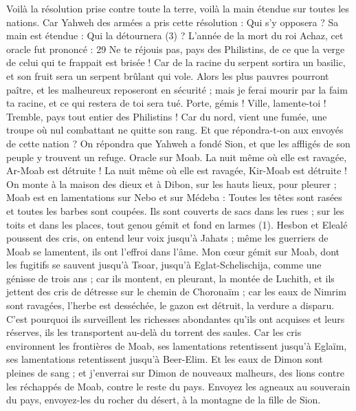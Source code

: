 \begin{multicols}{2}
{Voilà la résolution prise contre toute la terre, voilà la main étendue sur toutes les nations.
Car Yahweh des armées a pris cette résolution : Qui s’y opposera ? Sa main est étendue : Qui la détournera (3) ?
L'année de la mort du roi Achaz, cet oracle fut prononcé : 29 Ne te réjouis pas, pays des Philistins, de ce que la verge de celui qui te frappait est brisée ! Car de la racine du serpent sortira un basilic, et son fruit sera un serpent brûlant qui vole.
Alors les plus pauvres pourront paître, et les malheureux reposeront en sécurité ; mais je ferai mourir par la faim ta racine, et ce qui restera de toi sera tué.
Porte, gémis ! Ville, lamente-toi ! Tremble, pays tout entier des Philistins ! Car du nord, vient une fumée, une troupe où nul combattant ne quitte son rang.
Et que répondra-t-on aux envoyés de cette nation ? On répondra que Yahweh a fondé Sion, et que les affligés de son peuple y trouvent un refuge.
\VerseOne{}Oracle sur Moab. La nuit même où elle est ravagée, Ar-Moab est détruite ! La nuit même où elle est ravagée, Kir-Moab est détruite !
On monte à la maison des dieux et à Dibon, sur les hauts lieux, pour pleurer ; Moab est en lamentations sur Nebo et sur Médeba : Toutes les têtes sont rasées et toutes les barbes sont coupées.
Ils sont couverts de sacs dans les rues ; sur les toits et dans les places, tout genou gémit et fond en larmes (1).
Hesbon et Elealé poussent des cris, on entend leur voix jusqu’à Jahats ; même les guerriers de Moab se lamentent, ils ont l’effroi dans l’âme.
Mon cœur gémit sur Moab, dont les fugitifs se sauvent jusqu’à Tsoar, jusqu’à Eglat-Schelischija, comme une génisse de trois ans ; car ils montent, en pleurant, la montée de Luchith, et ils jettent des cris de détresse sur le chemin de Choronaïm ;
car les eaux de Nimrim sont ravagées, l’herbe est desséchée, le gazon est détruit, la verdure a disparu.
C’est pourquoi ils surveillent les richesses abondantes qu’ils ont acquises et leurs réserves, ils les transportent au-delà du torrent des saules.
Car les cris environnent les frontières de Moab, ses lamentations retentissent jusqu'à Eglaïm, ses lamentations retentissent jusqu'à Beer-Elim.
Et les eaux de Dimon sont pleines de sang ; et j’enverrai sur Dimon de nouveaux malheurs, des lions contre les réchappés de Moab, contre le reste du pays.
\VerseOne{}Envoyez les agneaux au souverain du pays, envoyez-les du rocher du désert, à la montagne de la fille de Sion.
}
\end{multicols}
